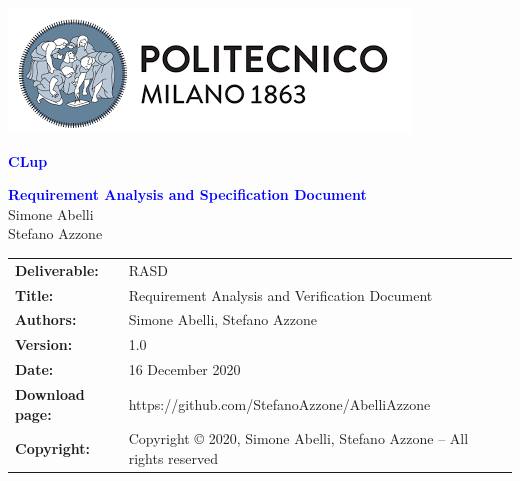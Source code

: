 
\usepackage[utf8]{inputenc}
\usepackage[dvipsnames]{xcolor}
\usepackage{listings}
\usepackage{alloy-style}



\begin{titlepage}



\centering
\includegraphics[scale=0.5]{Images/PolimiLogo}

\vspace{4cm}

{\textcolor{Blue}{\textbf{\Huge{CLup}}}} \\ [1cm]


\vspace{4cm}

{\textcolor{Blue}{\textbf{\Huge{Requirement Analysis and Specification
        Document}}}} \\ [1cm]

\vspace{4cm}
Simone Abelli \\
Stefano Azzone

\end{titlepage}

\begin{table}[h!]
\begin{tabu} to \textwidth { X[0.3,r,p] X[0.7,l,p] }
\hline

\textbf{Deliverable:} & RASD\\
\textbf{Title:} & Requirement Analysis and Verification Document \\
\textbf{Authors:} & Simone Abelli, Stefano Azzone \\
\textbf{Version:} & 1.0 \\ 
\textbf{Date:} & 16 December 2020 \\
\textbf{Download page:} & https://github.com/StefanoAzzone/AbelliAzzone \\
\textbf{Copyright:} & Copyright © 2020, Simone Abelli, Stefano Azzone – All rights reserved \\
\hline
\end{tabu}
\end{table}




